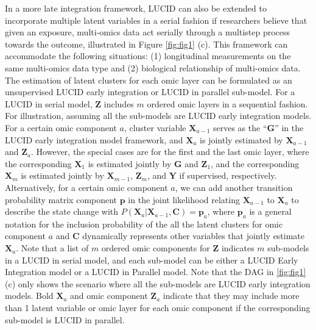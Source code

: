 In a more late integration framework, LUCID can also be extended to
incorporate multiple latent variables in a serial fashion if researchers
believe that given an exposure, multi-omics data act serially through a
multistep process towards the outcome, illustrated in Figure
\ref{fig:fig1} (c). This framework can accommodate the following
situations: (1) longitudinal measurements on the same multi-omics data
type and (2) biological relationship of multi-omics data. The estimation
of latent clusters for each omic layer can be formulated as an
unsupervised LUCID early integration or LUCID in parallel sub-model. For
a LUCID in serial model, \(\boldsymbol{\mathbf{Z}}\) includes \(m\) ordered
omic layers in a sequential fashion. For illustration, assuming all the
sub-models are LUCID early integration models. For a certain omic
component \(a\), cluster variable \(\boldsymbol{\mathbf{X}}_{a - 1}\) serves
as the ``\(\boldsymbol{\mathbf{G}}\)'' in the LUCID early integration model
framework, and \(\boldsymbol{\mathbf{X}}_a\) is jointly estimated by
\(\boldsymbol{\mathbf{X}}_{a - 1}\) and \(\boldsymbol{\mathbf{Z}}_a\).
However, the special cases are for the first and the last omic layer,
where the corresponding \(\boldsymbol{\mathbf{X}}_{1}\) is estimated
jointly by \(\boldsymbol{\mathbf{G}}\) and \(\boldsymbol{\mathbf{Z}}_1\),
and the corresponding \(\boldsymbol{\mathbf{X}}_{m}\) is estimated jointly
by \(\boldsymbol{\mathbf{X}}_{m - 1}\), \(\boldsymbol{\mathbf{Z}}_m\), and
\(\boldsymbol{\mathbf{Y}}\) if supervised, respectively. Alternatively,
for a certain omic component \(a\), we can add another transition
probability matrix component \(\boldsymbol{\mathbf{p}}\) in the joint
likelihood relating \(\boldsymbol{\mathbf{X}}_{a - 1}\) to
\(\boldsymbol{\mathbf{X}}_a\) to describe the state change with
\(P(\boldsymbol{\mathbf{X}}_a|\boldsymbol{\mathbf{X}}_{a - 1}, \boldsymbol{\mathbf{C}}) = \boldsymbol{\mathbf{p}}_a\),
where \(\boldsymbol{\mathbf{p}}_a\) is a general notation for the
inclusion probability of the all the latent clusters for omic component
\(a\) and \(\boldsymbol{\mathbf{C}}\) dynamically represents other variables
that jointly estimate \(\boldsymbol{\mathbf{X}}_{a}\). Note that a list of
\(m\) ordered omic components for \(\boldsymbol{\mathbf{Z}}\) indicates \(m\)
sub-models in a LUCID in serial model, and each sub-model can be either
a LUCID Early Integration model or a LUCID in Parallel model. Note that
the DAG in \ref{fig:fig1} (c) only shows the scenario where all the
sub-models are LUCID early integration models. Bold
\(\boldsymbol{\mathbf{X}}_{a}\) and omic component
\(\boldsymbol{\mathbf{Z}}_a\) indicate that they may include more than 1
latent variable or omic layer for each omic component if the
corresponding sub-model is LUCID in parallel.

